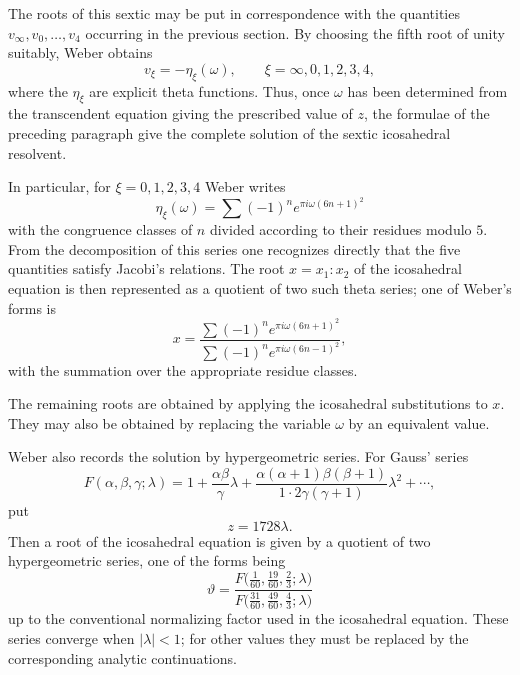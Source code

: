 \documentclass[12pt,a4paper]{article}
\begin{document}
The roots of this sextic may be put in correspondence with the quantities $v_\infty,v_0,
\ldots,v_4$ occurring in the previous section.  By choosing the fifth root of unity suitably, Weber obtains
\begin{equation}
 v_\xi=-\eta_\xi(\omega),
 \qquad \xi=\infty,0,1,2,3,4,
\end{equation}
where the $\eta_\xi$ are explicit theta functions.  Thus, once $\omega$ has been determined from the transcendent equation giving the prescribed value of $z$, the formulae of the preceding paragraph give the complete solution of the sextic icosahedral resolvent.

In particular, for $\xi=0,1,2,3,4$ Weber writes
\begin{equation}
 \eta_\xi(\omega)=\sum (-1)^{n}e^{\pi i\omega(6n+1)^2}
\end{equation}
with the congruence classes of $n$ divided according to their residues modulo $5$.  From the decomposition of this series one recognizes directly that the five quantities satisfy Jacobi's relations.  The root $x=x_1:x_2$ of the icosahedral equation is then represented as a quotient of two such theta series; one of Weber's forms is
\begin{equation}
 x=\frac{\sum (-1)^n e^{\pi i\omega(6n+1)^2}}
         {\sum (-1)^n e^{\pi i\omega(6n-1)^2}},
\end{equation}
with the summation over the appropriate residue classes.

The remaining roots are obtained by applying the icosahedral substitutions to $x$.  They may also be obtained by replacing the variable $\omega$ by an equivalent value.

Weber also records the solution by hypergeometric series.  For Gauss' series
\[
 F(\alpha,\beta,\gamma;\lambda)
 =1+\frac{\alpha\beta}{\gamma}\lambda
 +\frac{\alpha(\alpha+1)\beta(\beta+1)}{1\cdot2\gamma(\gamma+1)}\lambda^2+
 \cdots,
\]
put
\[
 z=1728\lambda.
\]
Then a root of the icosahedral equation is given by a quotient of two hypergeometric series, one of the forms being
\begin{equation}
 \vartheta=
 \frac{F\bigl(\frac{1}{60},\frac{19}{60},\frac{2}{3};\lambda\bigr)}
      {F\bigl(\frac{31}{60},\frac{49}{60},\frac{4}{3};\lambda\bigr)}
\end{equation}
up to the conventional normalizing factor used in the icosahedral equation.  These series converge when $|\lambda|<1$; for other values they must be replaced by the corresponding analytic continuations.
\end{document}

